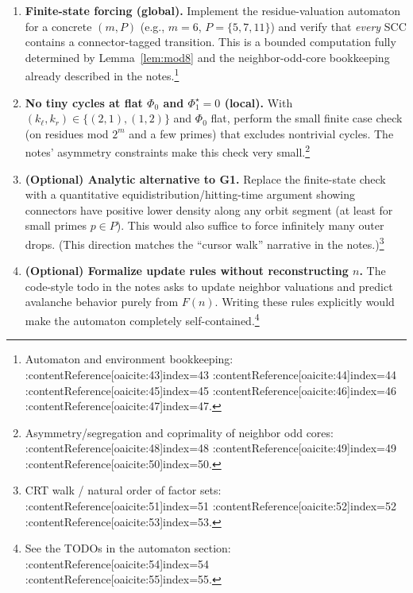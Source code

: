 \documentclass[11pt]{article}
\begin{document}
\begin{enumerate}[label=\textbf{G\arabic*.}, leftmargin=1.5em]
  \item \textbf{Finite-state forcing (global).}
  Implement the residue-valuation automaton for a concrete $(m,P)$ (e.g., $m=6$, $P=\{5,7,11\}$) and verify that \emph{every} SCC contains a connector-tagged transition. This is a bounded computation fully determined by Lemma~\ref{lem:mod8} and the neighbor-odd-core bookkeeping already described in the notes.\footnote{Automaton and environment bookkeeping: :contentReference[oaicite:43]{index=43} :contentReference[oaicite:44]{index=44} :contentReference[oaicite:45]{index=45} :contentReference[oaicite:46]{index=46} :contentReference[oaicite:47]{index=47}.}
  \item \textbf{No tiny cycles at flat $\Phi_0$ and $\Phi_1^\star=0$ (local).}
  With $(k_\ell,k_r)\in\{(2,1),(1,2)\}$ and $\Phi_0$ flat, perform the small finite case check (on residues mod $2^m$ and a few primes) that excludes nontrivial cycles. The notes' asymmetry constraints make this check very small.\footnote{Asymmetry/segregation and coprimality of neighbor odd cores: :contentReference[oaicite:48]{index=48} :contentReference[oaicite:49]{index=49} :contentReference[oaicite:50]{index=50}.}
  \item \textbf{(Optional) Analytic alternative to G1.}
  Replace the finite-state check with a quantitative equidistribution/hitting-time argument showing connectors have positive lower density along any orbit segment (at least for small primes $p\in P$). This would also suffice to force infinitely many outer drops. (This direction matches the ``cursor walk'' narrative in the notes.)\footnote{CRT walk / natural order of factor sets: :contentReference[oaicite:51]{index=51} :contentReference[oaicite:52]{index=52} :contentReference[oaicite:53]{index=53}.}
  \item \textbf{(Optional) Formalize update rules without reconstructing $n$.}
  The code-style todo in the notes asks to update neighbor valuations and predict avalanche behavior purely from $F(n)$. Writing these rules explicitly would make the automaton completely self-contained.\footnote{See the TODOs in the automaton section: :contentReference[oaicite:54]{index=54} :contentReference[oaicite:55]{index=55}.}
\end{enumerate}
\end{document}
